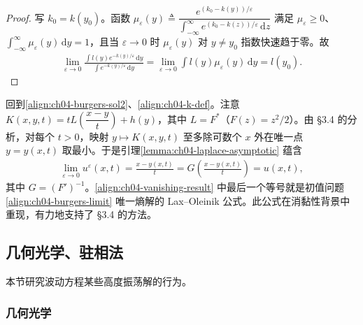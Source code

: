\documentclass[../../main.tex]{subfiles}
\begin{document}
\begin{proof}
写 $k_0=k(y_0)$。函数 $\mu_\varepsilon(y)\triangleq\dfrac{e^{(k_0-k(y))/\varepsilon}}{\int_{-\infty}^\infty e^{(k_0-k(z))/\varepsilon}\,\mathrm{d}z}$ 满足 $\mu_\varepsilon\geqslant 0$、$\int_{-\infty}^\infty\mu_\varepsilon(y)\,\mathrm{d}y=1$，且当 $\varepsilon\to 0$ 时 $\mu_\varepsilon(y)$ 对 $y\neq y_0$ 指数快速趋于零。故
\begin{align*}
\lim_{\varepsilon\to 0}\frac{\int l(y)e^{-k(y)/\varepsilon}\,\mathrm{d}y}{\int e^{-k(y)/\varepsilon}\,\mathrm{d}y}=\lim_{\varepsilon\to 0}\int l(y)\mu_\varepsilon(y)\,\mathrm{d}y=l(y_0).
\end{align*}
\end{proof}

回到\eqref{align:ch04-burgers-sol2}、\eqref{align:ch04-k-def}。注意 $K(x,y,t)=tL\!\left(\dfrac{x-y}{t}\right)+h(y)$，其中 $L=F^*$（$F(z)=z^2/2$）。由 \S3.4 的分析，对每个 $t>0$，映射 $y\mapsto K(x,y,t)$ 至多除可数个 $x$ 外在唯一点 $y=y(x,t)$ 取最小。于是引理\cref{lemma:ch04-laplace-asymptotic} 蕴含
\begin{align}\label{align:ch04-vanishing-result}
\lim_{\varepsilon\to 0}u^\varepsilon(x,t)=\frac{x-y(x,t)}{t}=G\!\left(\frac{x-y(x,t)}{t}\right)=u(x,t),
\end{align}
其中 $G=(F')^{-1}$。\eqref{align:ch04-vanishing-result} 中最后一个等号就是初值问题\eqref{align:ch04-burgers-limit} 唯一熵解的 Lax--Oleinik 公式。此公式在消黏性背景中重现，有力地支持了 \S3.4 的方法。

\subsection{几何光学、驻相法}\label{subsection:ch04-stationary}

本节研究波动方程某些高度振荡解的行为。

\subsubsection{几何光学}
\end{document}
